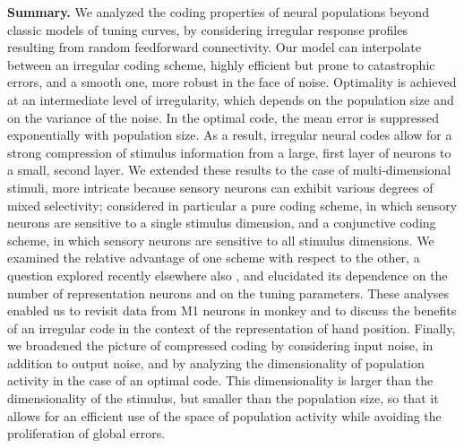 \documentclass[a4paper]{article}%
\begin{document}
\textbf{Summary.} We analyzed the coding properties of neural populations
beyond classic models of tuning curves, by considering irregular response
profiles resulting from random feedforward connectivity. Our model can
interpolate between an irregular coding scheme, highly efficient but prone to
catastrophic errors, and a smooth one, more robust in the face of noise.
Optimality is achieved at an intermediate level of irregularity, which depends
on the population size and on the variance of the noise. In the optimal code,
the mean error is suppressed exponentially with population size. As a result,
irregular neural codes allow for a strong compression of stimulus information
from a large, first layer of neurons to a small, second layer. We extended
these results to the case of multi-dimensional stimuli, more intricate because
sensory neurons can exhibit various degrees of mixed selectivity; considered
in particular a pure coding scheme, in which sensory neurons are sensitive to
a single stimulus dimension, and a conjunctive coding scheme, in which sensory
neurons are sensitive to all stimulus dimensions. We examined the relative
advantage of one scheme with respect to the other, a question explored
recently elsewhere also
\cite{Finkelstein2018OptimalBats,Harel2020OptimalConstraints}, and elucidated
its dependence on the number of representation neurons and on the tuning
parameters. These analyses enabled us to revisit data from M1 neurons in
monkey \cite{Lalazar2016TuningConnectivity} and to discuss the benefits of an
irregular code in the context of the representation of hand position. Finally,
we broadened the picture of compressed coding by considering input noise, in
addition to output noise, and by analyzing the dimensionality of population
activity in the case of an optimal code. This dimensionality is larger than
the dimensionality of the stimulus, but smaller than the population size, so
that it allows for an efficient use of the space of population activity while
avoiding the proliferation of global errors.
\end{document}

